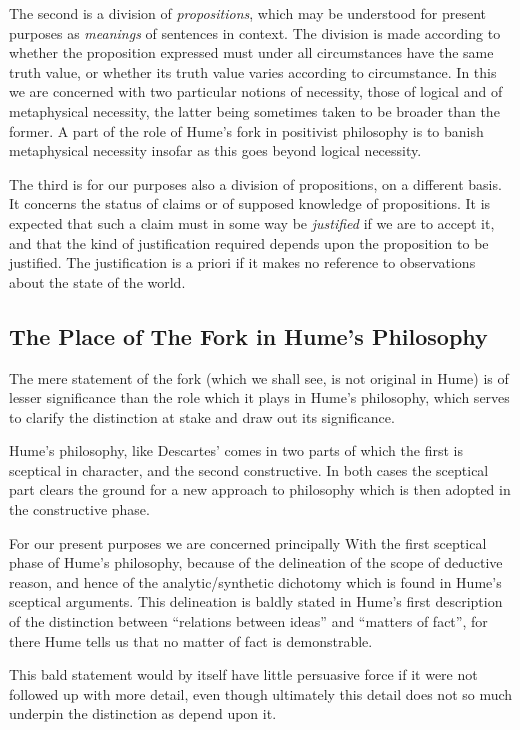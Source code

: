 The second is a division of {\it propositions}, which may be
understood for present purposes as {\it meanings} of sentences in
context.
The division is made according to whether the proposition
expressed must under all circumstances have the same truth value, or
whether its truth value varies according to circumstance.
In this we are concerned with two particular notions of necessity,
those of logical and of metaphysical necessity, the latter being
sometimes taken to be broader than the former.
A part of the role of Hume's fork in positivist philosophy is to
banish metaphysical necessity insofar as this goes beyond logical necessity.

The third is for our purposes also a division of propositions, on a
different basis.
It concerns the status of claims or of supposed knowledge of
propositions. 
It is expected that such a claim must in some way be
{\it justified} if we are to accept it, and that the kind of
justification required depends upon the proposition to be justified.
The justification is a priori if it makes no reference to observations
about the state of the world.

\subsection{The Place of The Fork in Hume's Philosophy}

The mere statement of the fork (which we shall see, is not original in
Hume) is of lesser significance than the role which it plays in Hume's
philosophy, which serves to clarify the distinction at stake and draw
out its significance.

Hume's philosophy, like Descartes' comes in two parts of which the
first is sceptical in character, and the second constructive.
In both cases the sceptical part clears the ground for a new approach
to philosophy which is then adopted in the constructive phase.

For our present purposes we are concerned principally With the first
sceptical phase of Hume's philosophy, because of the delineation of the scope
of deductive reason, and hence of the analytic/\-synthetic dichotomy
which is found in Hume's sceptical arguments.
This delineation is baldly stated in Hume's first description of the
distinction between ``relations between ideas'' and ``matters of
fact'', for there Hume tells us that no matter of fact is
demonstrable.

This bald statement would by itself have little persuasive force if it
were not followed up with more detail, even though ultimately this
detail does not so much underpin the distinction as depend upon it.

